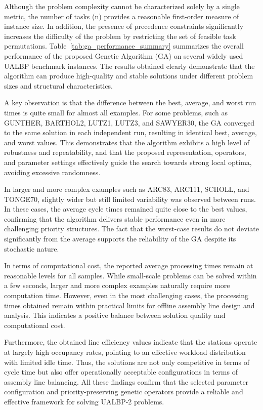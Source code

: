 \documentclass[12pt,a4paper]{article}
\begin{document}
Although the problem complexity cannot be characterized solely by a single metric, the number of tasks (n) provides a reasonable first-order measure of instance size. In addition, the presence of precedence constraints significantly increases the difficulty of the problem by restricting the set of feasible task permutations. Table~\cref{tab:ga_performance_summary} summarizes the overall performance of the proposed Genetic Algorithm (GA) on several widely used UALBP benchmark instances. The results obtained clearly demonstrate that the algorithm can produce high-quality and stable solutions under different problem sizes and structural characteristics.

A key observation is that the difference between the best, average, and worst run times is quite small for almost all examples. For some problems, such as GUNTHER, BARTHOL2, LUTZ1, LUTZ3, and SAWYER30, the GA converged to the same solution in each independent run, resulting in identical best, average, and worst values. This demonstrates that the algorithm exhibits a high level of robustness and repeatability, and that the proposed representation, operators, and parameter settings effectively guide the search towards strong local optima, avoiding excessive randomness.

In larger and more complex examples such as ARC83, ARC111, SCHOLL, and TONGE70, slightly wider but still limited variability was observed between runs. In these cases, the average cycle times remained quite close to the best values, confirming that the algorithm delivers stable performance even in more challenging priority structures. The fact that the worst-case results do not deviate significantly from the average supports the reliability of the GA despite its stochastic nature.

In terms of computational cost, the reported average processing times remain at reasonable levels for all samples. While small-scale problems can be solved within a few seconds, larger and more complex examples naturally require more computation time. However, even in the most challenging cases, the processing times obtained remain within practical limits for offline assembly line design and analysis. This indicates a positive balance between solution quality and computational cost.

Furthermore, the obtained line efficiency values indicate that the stations operate at largely high occupancy rates, pointing to an effective workload distribution with limited idle time. Thus, the solutions are not only competitive in terms of cycle time but also offer operationally acceptable configurations in terms of assembly line balancing. All these findings confirm that the selected parameter configuration and priority-preserving genetic operators provide a reliable and effective framework for solving UALBP-2 problems.
\end{document}
